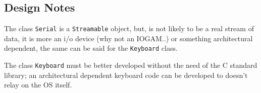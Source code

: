 \subsection{Design Notes}
The class \texttt{Serial} is a \texttt{Streamable} object, but, is not likely to be a real stream of data, it is more an i/o device (why not an IOGAM..) or something architectural dependent, the same can be said for the \texttt{Keyboard} class.

The class \texttt{Keyboard} must be better developed without the need of the C standard library; an architectural dependent keyboard code can be developed to doesn't relay on the OS itself.



